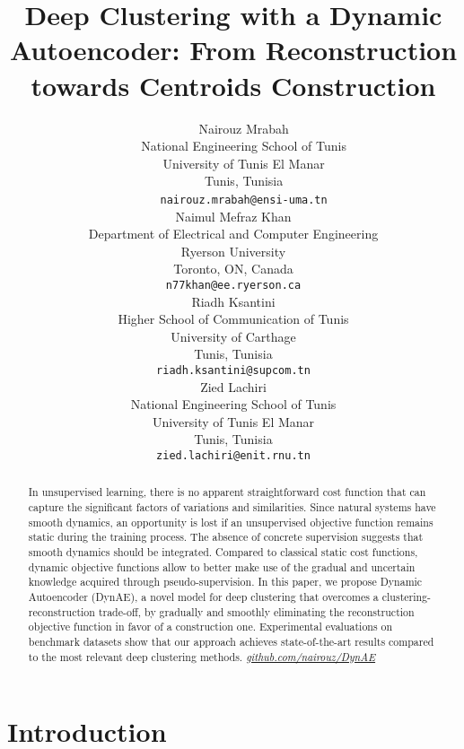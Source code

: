 \documentclass{article}
\title{Deep Clustering with a Dynamic Autoencoder: From Reconstruction towards Centroids Construction}
\author{
    $\: \: \: \: \: \:$ Nairouz Mrabah\\
    $\: \: \: \: \: \:$  National Engineering School of Tunis\\
    $\: \: \: \: \: \:$  University of Tunis El Manar\\
    $\: \: \: \: \: \:$ Tunis, Tunisia\\
  $\: \: \: \: \: \:$ \texttt{nairouz.mrabah@ensi-uma.tn} \\
\And
  Naimul Mefraz Khan\\
  Department of Electrical and Computer Engineering\\
  Ryerson University\\
  Toronto, ON, Canada\\
  \texttt{n77khan@ee.ryerson.ca} \\
  \And
  Riadh Ksantini\\
  Higher School of Communication of Tunis\\
  University of Carthage\\
  Tunis, Tunisia\\
  \texttt{riadh.ksantini@supcom.tn}\\
  \And
  Zied Lachiri\\
  National Engineering School of Tunis\\
  University of Tunis El Manar\\
  Tunis, Tunisia\\
  \texttt{zied.lachiri@enit.rnu.tn}\\
}
\begin{document}
\maketitle

\begin{abstract}
In unsupervised learning, there is no apparent straightforward cost function that can capture the significant factors of variations and similarities. Since natural systems have smooth dynamics, an opportunity is lost if an unsupervised objective function remains static during the training process. The absence of concrete supervision suggests that smooth dynamics should be integrated. Compared to classical static cost functions, dynamic objective functions allow to better make use of the gradual and uncertain knowledge acquired through pseudo-supervision. In this paper, we propose Dynamic Autoencoder (DynAE), a novel model for deep clustering that overcomes a clustering-reconstruction trade-off, by gradually and smoothly eliminating the reconstruction objective function in favor of a construction one. Experimental evaluations on benchmark datasets show that our approach achieves state-of-the-art results compared to the most relevant deep clustering methods. \textit{\href{https://github.com/nairouz/DynAE}{github.com/nairouz/DynAE}} 
\end{abstract}




\section{Introduction}
\end{document}
